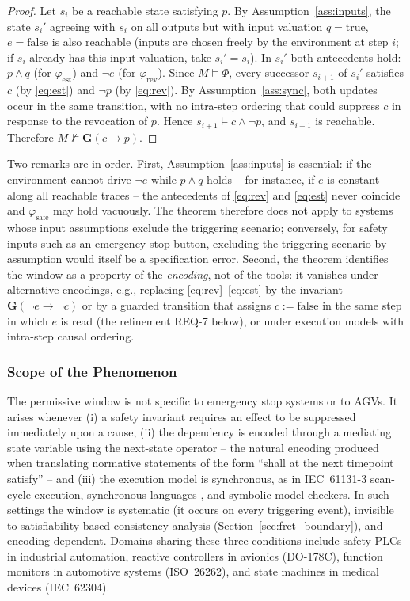 \documentclass{ieeeaccess}
\theoremstyle{definition}
\newcommand{\G}{\mathbf{G}}
\begin{document}
\begin{proof}
Let $s_i$ be a reachable state satisfying $p$. By Assumption~\ref{ass:inputs}, the state $s_i'$ agreeing with $s_i$ on all outputs but with input valuation $q = \mathrm{true}$, $e = \mathrm{false}$ is also reachable (inputs are chosen freely by the environment at step $i$; if $s_i$ already has this input valuation, take $s_i' = s_i$). In $s_i'$ both antecedents hold: $p \wedge q$ (for $\varphi_{\mathrm{est}}$) and $\neg e$ (for $\varphi_{\mathrm{rev}}$). Since $M \models \Phi$, every successor $s_{i+1}$ of $s_i'$ satisfies $c$ (by \eqref{eq:est}) and $\neg p$ (by \eqref{eq:rev}). By Assumption~\ref{ass:sync}, both updates occur in the same transition, with no intra-step ordering that could suppress $c$ in response to the revocation of $p$. Hence $s_{i+1} \models c \wedge \neg p$, and $s_{i+1}$ is reachable. Therefore $M \not\models \G(c \rightarrow p)$.
\end{proof}

Two remarks are in order. First, Assumption~\ref{ass:inputs} is essential: if the environment cannot drive $\neg e$ while $p \wedge q$ holds -- for instance, if $e$ is constant along all reachable traces -- the antecedents of \eqref{eq:rev} and \eqref{eq:est} never coincide and $\varphi_{\mathrm{safe}}$ may hold vacuously. The theorem therefore does not apply to systems whose input assumptions exclude the triggering scenario; conversely, for safety inputs such as an emergency stop button, excluding the triggering scenario by assumption would itself be a specification error. Second, the theorem identifies the window as a property of the \emph{encoding}, not of the tools: it vanishes under alternative encodings, e.g., replacing \eqref{eq:rev}--\eqref{eq:est} by the invariant $\G(\neg e \rightarrow \neg c)$ or by a guarded transition that assigns $c := \mathrm{false}$ in the same step in which $e$ is read (the refinement REQ-7 below), or under execution models with intra-step causal ordering.

\subsubsection*{Scope of the Phenomenon}
The permissive window is not specific to emergency stop systems or to AGVs. It arises whenever (i) a safety invariant requires an effect to be suppressed immediately upon a cause, (ii) the dependency is encoded through a mediating state variable using the next-state operator -- the natural encoding produced when translating normative statements of the form ``shall at the next timepoint satisfy'' -- and (iii) the execution model is synchronous, as in IEC~61131-3 scan-cycle execution, synchronous languages \cite{Esterel,Halbwachs}, and symbolic model checkers. In such settings the window is systematic (it occurs on every triggering event), invisible to satisfiability-based consistency analysis (Section~\ref{sec:fret_boundary}), and encoding-dependent. Domains sharing these three conditions include safety PLCs in industrial automation, reactive controllers in avionics (DO-178C), function monitors in automotive systems (ISO~26262), and state machines in medical devices (IEC~62304).
\end{document}
